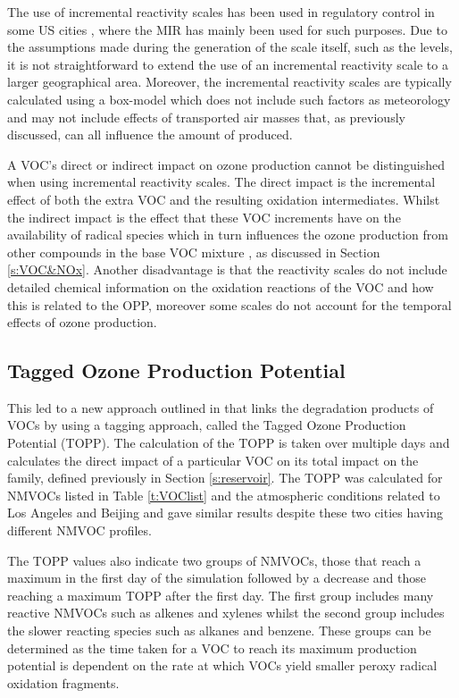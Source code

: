 The use of incremental reactivity scales has been used in regulatory control in some US cities \citep{Luecken:2008}, where the 
MIR has mainly been used for such purposes. Due to the assumptions made during the generation of the scale itself, such as the 
 levels, it is not straightforward to extend the use of an incremental reactivity scale to a larger geographical area.
Moreover, the incremental reactivity scales are typically calculated using a box-model which does not include such factors as 
meteorology and may not include effects of transported air masses that, as previously discussed, can all influence the amount 
of  produced. 

A VOC's direct or indirect impact on ozone production cannot be distinguished when using incremental reactivity scales. The 
direct impact is the incremental effect of both the extra VOC and the resulting oxidation intermediates. Whilst the indirect 
impact is the effect that these VOC increments have on the availability of radical species which in turn influences the ozone 
production from other compounds in the base VOC mixture \citep{Butler:2011}, as discussed in Section \ref{s:VOC&NOx}. Another 
disadvantage is that the reactivity scales do not include detailed chemical information on the oxidation reactions of the VOC 
and how this is related to the OPP, moreover some scales do not account for the temporal effects of ozone production.

\subsection{Tagged Ozone Production Potential} \label{s:TOPP}
This led to a new approach outlined in \citep{Butler:2011} that links the degradation products of VOCs by using a tagging 
approach, called the Tagged Ozone Production Potential (TOPP). The calculation of the TOPP is taken over multiple days and 
calculates the direct impact of a particular VOC on its total impact on the  family, defined previously in Section
\ref{s:reservoir}. The TOPP was calculated for NMVOCs listed in Table \ref{t:VOClist} and the atmospheric conditions related to
Los Angeles and Beijing and gave similar results despite these two cities having different NMVOC profiles. 

The TOPP values also indicate two groups of NMVOCs, those that reach a maximum in the first day of the simulation followed by a
decrease and those reaching a maximum TOPP after the first day. The first group includes many reactive NMVOCs such as alkenes 
and xylenes whilst the second group includes the slower reacting species such as alkanes and benzene. These groups can be 
determined as the time taken for a VOC to reach its maximum  production potential is dependent on the rate at which VOCs
yield smaller peroxy radical oxidation fragments. 

